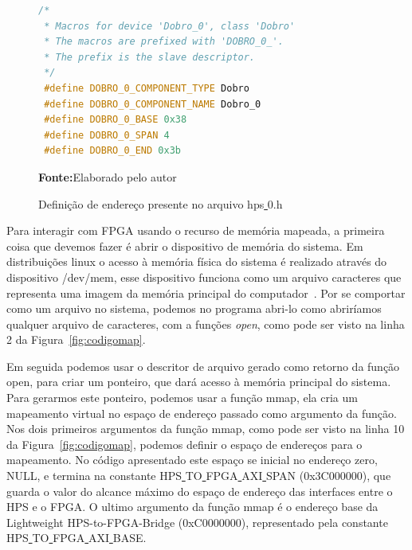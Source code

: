 \begin{figure}[ht]
\caption{Definição de endereço presente no arquivo hps\underline{ }0.h}
\begin{center}
\begin{lstlisting}[language=C++, backgroundcolor=\color{gray!10}]
 /*
 * Macros for device 'Dobro_0', class 'Dobro'
 * The macros are prefixed with 'DOBRO_0_'.
 * The prefix is the slave descriptor.
 */
 #define DOBRO_0_COMPONENT_TYPE Dobro
 #define DOBRO_0_COMPONENT_NAME Dobro_0
 #define DOBRO_0_BASE 0x38
 #define DOBRO_0_SPAN 4
 #define DOBRO_0_END 0x3b
\end{lstlisting}
{\small \textbf{Fonte:}Elaborado pelo autor}	
\end{center}\label{fig:codigodobro}
\end{figure}


Para interagir com FPGA usando o recurso de memória mapeada, a primeira coisa que devemos fazer é abrir o dispositivo de memória do sistema. Em distribuições linux o acesso à memória física do sistema é realizado através do dispositivo /dev/mem, esse dispositivo funciona como um arquivo caracteres que representa uma imagem da memória principal do computador~\cite{manmem}. Por se comportar como um arquivo no sistema, podemos no programa abri-lo como abriríamos qualquer arquivo de caracteres, com a funções \textit{open}, como pode ser visto na linha 2 da Figura~\ref{fig:codigomap}.

Em seguida podemos usar o descritor de arquivo gerado como retorno da função open, para criar um ponteiro, que dará acesso à memória principal do sistema. Para gerarmos este ponteiro, podemos usar a função mmap, ela cria um mapeamento virtual no espaço de endereço passado como argumento da função. Nos dois primeiros argumentos da função mmap, como pode ser visto na linha 10 da Figura~\ref{fig:codigomap},  podemos definir o espaço de endereços para o mapeamento. No código apresentado este espaço se inicial no endereço zero, NULL\@, e termina na constante HPS\underline{ }TO\underline{ }FPGA\underline{ }AXI\underline{ }SPAN (0x3C000000), que guarda o valor do alcance máximo do espaço de endereço das interfaces entre o HPS e o FPGA\@. O ultimo argumento da função mmap é o endereço base da Lightweight HPS-to-FPGA-Bridge (0xC0000000), representado pela constante HPS\underline{ }TO\underline{ }FPGA\underline{ }AXI\underline{ }BASE.



